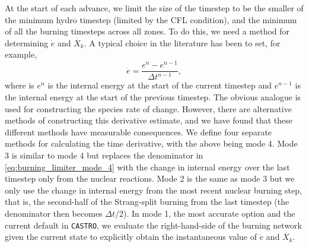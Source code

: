 \documentclass[twocolumn,numberedappendix]{../aastex6}
\newcommand{\castro}{\texttt{CASTRO}}
\begin{document}
At the start of each advance, we limit the size of the timestep to be the smaller
of the minimum hydro timestep (limited by the CFL condition), and the minimum of all the
burning timesteps across all zones. To do this, we need a method for determining 
$\dot{e}$ and $\dot{X_k}$. A typical choice in the literature has been to set, for example,
\begin{equation}
  \dot{e} = \frac{e^{n} - e^{n-1}}{\Delta t^{n-1}}, \label{eq:burning_limiter_mode_4}
\end{equation}
where is $e^n$ is the internal energy at the start of the current timestep and
$e^{n-1}$ is the internal energy at the start of the previous timestep. 
The obvious analogue is used for constructing the species rate of change.
However, there are alternative methods of constructing this derivative estimate, 
and we have found that these different methods have measurable consequences.
We define four separate methods for calculating the time derivative, with 
the above being mode 4. Mode 3 is similar to mode 4 but replaces the
denominator in \autoref{eq:burning_limiter_mode_4} with the change in 
internal energy over the last timestep only from the nuclear reactions.
Mode 2 is the same as mode 3 but we only use the change in internal 
energy from the most recent nuclear burning step, that is, the second-half
of the Strang-split burning from the last timestep (the denominator 
then becomes $\Delta t / 2$). In mode 1, the most accurate option and 
the current default in \castro, we evaluate the right-hand-side of the 
burning network given the current state to explicitly obtain the 
instantaneous value of $\dot{e}$ and $\dot{X_k}$. 
\end{document}
